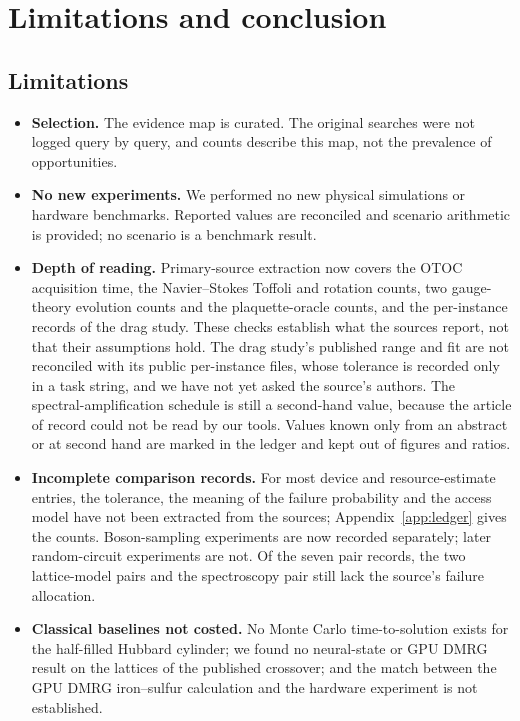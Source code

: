 \section{Limitations and conclusion}
\label{sec:end}

\subsection{Limitations}
\label{sec:limits}
\begin{itemize}
\item \textbf{Selection.} The evidence map is curated. The original searches were not logged query by query, and counts describe this map, not the prevalence of opportunities.
\item \textbf{No new experiments.} We performed no new physical simulations or hardware benchmarks. Reported values are reconciled and scenario arithmetic is provided; no scenario is a benchmark result.
\item \textbf{Depth of reading.} Primary-source extraction now covers the OTOC acquisition time, the Navier--Stokes Toffoli and rotation counts, two gauge-theory evolution counts and the plaquette-oracle counts, and the per-instance records of the drag study. These checks establish what the sources report, not that their assumptions hold. The drag study's published range and fit are not reconciled with its public per-instance files, whose tolerance is recorded only in a task string, and we have not yet asked the source's authors. The spectral-amplification schedule is still a second-hand value, because the article of record could not be read by our tools. Values known only from an abstract or at second hand are marked in the ledger and kept out of figures and ratios.
\item \textbf{Incomplete comparison records.} For most device and resource-estimate entries, the tolerance, the meaning of the failure probability and the access model have not been extracted from the sources; Appendix~\ref{app:ledger} gives the counts. Boson-sampling experiments are now recorded separately; later random-circuit experiments are not. Of the seven pair records, the two lattice-model pairs and the spectroscopy pair still lack the source's failure allocation.
\item \textbf{Classical baselines not costed.} No Monte Carlo time-to-solution exists for the half-filled Hubbard cylinder; we found no neural-state or GPU DMRG result on the lattices of the published crossover; and the match between the GPU DMRG iron--sulfur calculation and the hardware experiment is not established.

\end{itemize}
